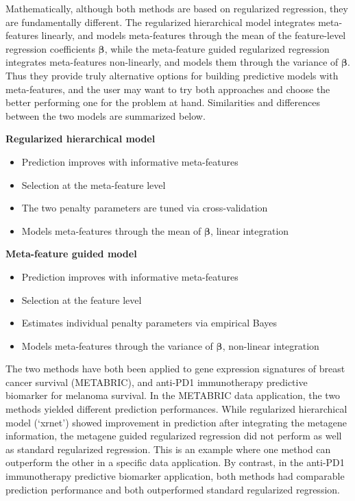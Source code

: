 Mathematically, although both methods are based on regularized regression, they are fundamentally different. The regularized hierarchical model integrates meta-features linearly, and models meta-features through the mean of the feature-level regression coefficients $\bm{\beta}$, while the meta-feature guided regularized regression integrates meta-features non-linearly, and models them through the variance of $\bm{\beta}$. Thus they provide truly alternative options for building predictive models with meta-features, and the user may want to try both approaches and choose the better performing one for the problem at hand. Similarities and differences between the two models are summarized below.
\begin{multicols}{2}
\textbf{Regularized hierarchical model}
\begin{itemize}
    \item Prediction improves with informative meta-features
    \item Selection at the meta-feature level
    \item The two penalty parameters are tuned via cross-validation
    \item Models meta-features through the mean of $\bm{\beta}$, linear integration 
\end{itemize}

\columnbreak

\textbf{Meta-feature guided model}
\begin{itemize}
    \item Prediction improves with informative meta-features
    \item Selection at the feature level
    \item Estimates individual penalty parameters via empirical Bayes
    \item Models meta-features through the variance of $\bm{\beta}$, non-linear integration
\end{itemize}
\end{multicols}

The two methods have both been applied to gene expression signatures of breast cancer survival (METABRIC), and anti-PD1 immunotherapy predictive biomarker for melanoma survival. In the METABRIC data application, the two methods yielded different prediction performances. While regularized hierarchical model (`xrnet') showed improvement in prediction after integrating the metagene information, the metagene guided regularized regression did not perform as well as standard regularized regression. This is an example where one method can outperform the other in a specific data application. By contrast, in the anti-PD1 immunotherapy predictive biomarker application, both methods had comparable prediction performance and  both outperformed standard regularized regression. 

